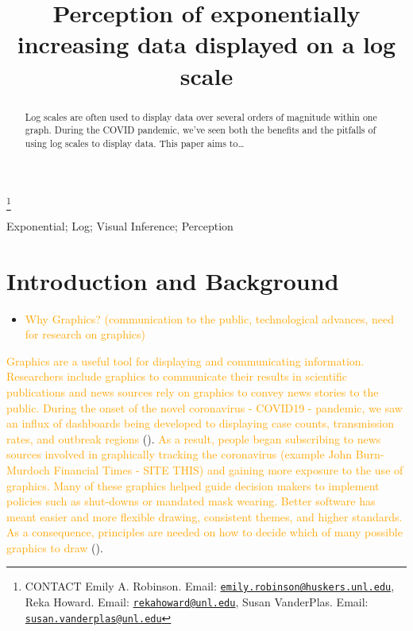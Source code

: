 \documentclass[]{interact}
\theoremstyle{plain}%
\theoremstyle{definition}
\theoremstyle{remark}
\begin{document}

\title{Perception of exponentially increasing data displayed on a log scale}


\author{
}

\thanks{CONTACT Emily A. Robinson. Email: \href{mailto:emily.robinson@huskers.unl.edu}{\nolinkurl{emily.robinson@huskers.unl.edu}}, Reka Howard. Email: \href{mailto:rekahoward@unl.edu}{\nolinkurl{rekahoward@unl.edu}}, Susan VanderPlas. Email: \href{mailto:susan.vanderplas@unl.edu}{\nolinkurl{susan.vanderplas@unl.edu}}}

\maketitle

\begin{abstract}
Log scales are often used to display data over several orders of
magnitude within one graph. During the COVID pandemic, we've seen both
the benefits and the pitfalls of using log scales to display data. This
paper aims to\ldots{}
\end{abstract}

\begin{keywords}
Exponential; Log; Visual Inference; Perception
\end{keywords}

\hypertarget{introduction-and-background}{%
\section{Introduction and
Background}\label{introduction-and-background}}

\begin{itemize}
\item
  \textcolor{Orange}{Why Graphics? (communication to the public, technological advances, need for research on graphics)}
\end{itemize}

\textcolor{Orange}{Graphics are a useful tool for displaying and communicating information. Researchers include graphics to communicate their results in scientific publications and news sources rely on graphics to convey news stories to the public. During the onset of the novel coronavirus - COVID19 - pandemic, we saw an influx of dashboards being developed to displaying case counts, transmission rates, and outbreak regions}
(\citet{lisa_charlotte_2020}).
\textcolor{Orange}{As a result, people began subscribing to news sources involved in graphically tracking the coronavirus (example John Burn-Murdoch Financial Times - SITE THIS) and gaining more exposure to the use of graphics. Many of these graphics helped guide decision makers to implement policies such as shut-downs or mandated mask wearing. Better software has meant easier and more flexible drawing, consistent themes, and higher standards. As a consequence, principles are needed on how to decide which of many possible graphics to draw}
(\citet{unwin_why_2020}).
\end{document}

